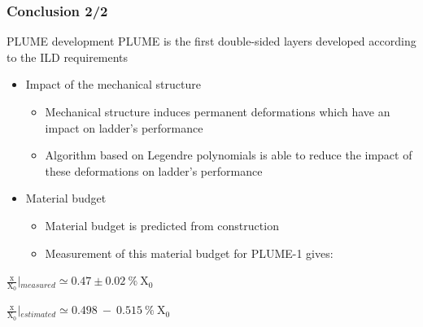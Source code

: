 \documentclass{beamer}
\begin{document}
\begin{frame}
  \frametitle{Conclusion 2/2}

    \begin{block}{PLUME development}
    PLUME is the first double-sided layers developed according to the ILD requirements
    \begin{itemize}
      \item Impact of the mechanical structure
      \begin{itemize}
        \item Mechanical structure induces permanent deformations which have an impact on ladder's performance
        \item Algorithm based on Legendre polynomials is able to reduce the impact of these deformations on ladder's performance
      \end{itemize}
      \item Material budget
      \begin{itemize}
        \item Material budget is predicted from construction
        \item Measurement of this material budget for PLUME-1 gives:
      \end{itemize}
    \end{itemize}
    \begin{center}
      $\frac{\text{x}}{\text{X}_0}\left|_{measured} \simeq 0.47 \pm 0.02~\%~\text{X}_0 \right.$

      $\frac{\text{x}}{\text{X}_0}\left|_{estimated} \simeq 0.498~-~0.515~\%~\text{X}_0 \right.$
     \end{center}
  \end{block}
\end{frame}
\end{document}
